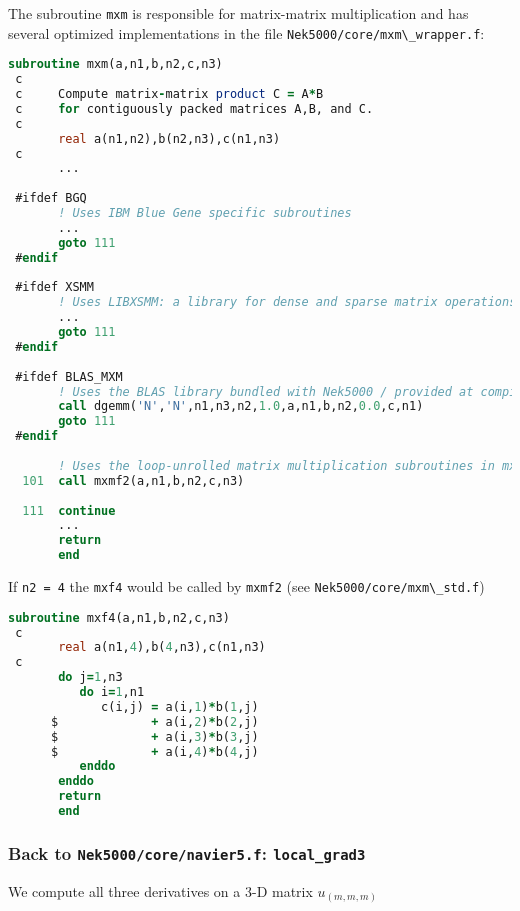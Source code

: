 \documentclass[
  a4paper,
  10pt]{article}
\newcommand{\passthrough}[1]{#1}
\begin{document}
The subroutine \passthrough{\lstinline!mxm!} is responsible for
matrix-matrix multiplication and has several optimized implementations
in the file \passthrough{\lstinline!Nek5000/core/mxm\_wrapper.f!}:

\begin{lstlisting}[language=Fortran]
       subroutine mxm(a,n1,b,n2,c,n3)
 c
 c     Compute matrix-matrix product C = A*B
 c     for contiguously packed matrices A,B, and C.
 c
       real a(n1,n2),b(n2,n3),c(n1,n3)
 c
       ...
 
 #ifdef BGQ
       ! Uses IBM Blue Gene specific subroutines
       ...
       goto 111
 #endif
 
 #ifdef XSMM
       ! Uses LIBXSMM: a library for dense and sparse matrix operations
       ...
       goto 111
 #endif
 
 #ifdef BLAS_MXM
       ! Uses the BLAS library bundled with Nek5000 / provided at compile-time
       call dgemm('N','N',n1,n3,n2,1.0,a,n1,b,n2,0.0,c,n1)
       goto 111
 #endif
 
       ! Uses the loop-unrolled matrix multiplication subroutines in mxm_std.f
  101  call mxmf2(a,n1,b,n2,c,n3)
 
  111  continue
       ...
       return
       end
\end{lstlisting}

If \passthrough{\lstinline!n2 = 4!} the \passthrough{\lstinline!mxf4!}
would be called by \passthrough{\lstinline!mxmf2!} (see
\passthrough{\lstinline!Nek5000/core/mxm\_std.f!})

\begin{lstlisting}[language=Fortran]
       subroutine mxf4(a,n1,b,n2,c,n3)
 c
       real a(n1,4),b(4,n3),c(n1,n3)
 c
       do j=1,n3
          do i=1,n1
             c(i,j) = a(i,1)*b(1,j)
      $             + a(i,2)*b(2,j)
      $             + a(i,3)*b(3,j)
      $             + a(i,4)*b(4,j)
          enddo
       enddo
       return
       end
\end{lstlisting}

\hypertarget{back-to-nek5000corenavier5.f-local_grad3}{%
\subsubsection{\texorpdfstring{Back to \texttt{Nek5000/core/navier5.f}:
\texttt{local\_grad3}}{Back to Nek5000/core/navier5.f: local\_grad3}}\label{back-to-nek5000corenavier5.f-local_grad3}}

We compute all three derivatives on a 3-D matrix \(u_{(m,m,m)}\)
\end{document}
